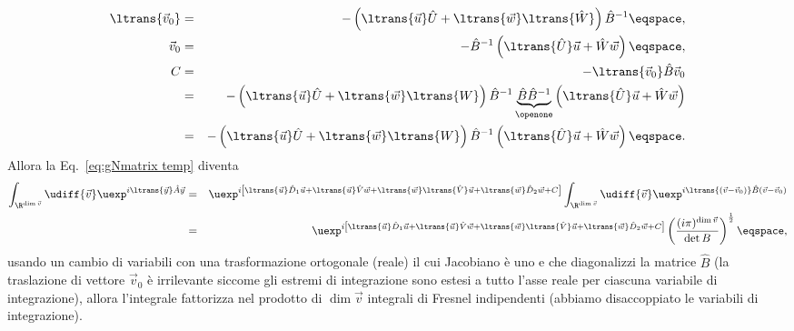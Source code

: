 \begin{eqnarray*}
\ltrans{\vec{v}_{0}} &=& - \left( \ltrans{\vec{u}} \hat{U} + \ltrans{\vec{w}}
\ltrans{\hat{W}} \right) \hat{B}^{-1} \eqspace ,\\
\vec{v}_{0} &=& - \hat{B}^{-1} \left( \ltrans{\hat{U}} \vec{u} + \hat{W} \vec{w}
\right) \eqspace , \\
C &=& - \ltrans{\vec{v}_{0}} \hat{B} \vec{v}_{0} \\
&=& 
- \left( \ltrans{\vec{u}} \hat{U} + \ltrans{\vec{w}} \ltrans{W} \right)
\hat{B}^{-1} \underbrace{\hat{B} \hat{B}^{-1}}_{\openone} \left( 
\ltrans{\hat{U}}\vec{u} +\hat{W} \vec{w} \right) \\
&=& 
- \left( \ltrans{\vec{u}} \hat{U} + \ltrans{\vec{w}} \ltrans{W} \right)
\hat{B}^{-1} \left( 
\ltrans{\hat{U}}\vec{u} +\hat{W} \vec{w} \right)  \eqspace .
\end{eqnarray*} 
Allora   la Eq.~\eqref{eq:gNmatrix temp} diventa
\begin{eqnarray}
\int_{\R^{\dim \vec{v}}} \udiff{\vec{v}}
\uexp^{i \ltrans{\vec{y}}
\hat{A} \vec{y}}  &=&
\uexp^{ i \left[  \ltrans{\vec{u}} \hat{D}_{1} \vec{u} + \ltrans{\vec{u}}
\hat{V} \vec{w} + \ltrans{\vec{w}} \ltrans{\hat{V}} \vec{u}  + \ltrans{\vec{w}}
\hat{D}_{2} \vec{w} + C\right]}  
\int_{\R^{\dim \vec{v}}} \udiff{\vec{v}}
\uexp^{ i \ltrans{\left( \vec{v}
- \vec{v}_{0} \right)} \hat{B} \left( \vec{v} - \vec{v}_{0} \right)} \nonumber \\
&=&
\uexp^{ i \left[  \ltrans{\vec{u}} \hat{D}_{1} \vec{u} + \ltrans{\vec{u}}
\hat{V} \vec{w} + \ltrans{\vec{w}} \ltrans{\hat{V}} \vec{u}  + \ltrans{\vec{w}}
\hat{D}_{2} \vec{w} + C\right]}  
\left( \frac{(i\pi)^{\dim \vec{v}} }{\det B} \right)^{\frac{1}{2}} \eqspace ,
\label{eq:detB}
\end{eqnarray}
usando un cambio di variabili con una trasformazione ortogonale (reale) il cui
Jacobiano \`e uno e che diagonalizzi la matrice $\hat{B}$ (la traslazione di
vettore $\vec{v}_{0}$ \`e irrilevante siccome gli estremi di integrazione sono
estesi a tutto l'asse reale per ciascuna variabile di integrazione), allora
l'integrale fattorizza nel prodotto di $\dim \vec{v}$ integrali di Fresnel
indipendenti (abbiamo disaccoppiato le variabili di integrazione).

